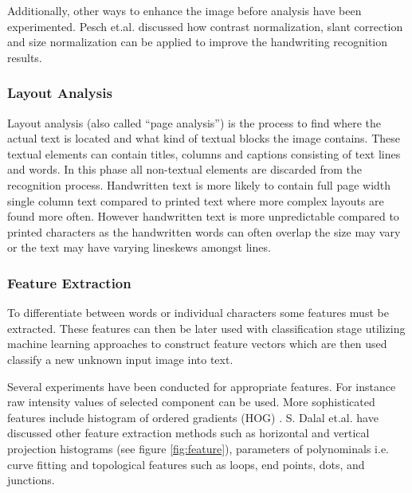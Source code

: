 \documentclass{article}
\begin{document}
        Additionally, other ways to enhance the image before analysis have been experimented. Pesch et.al. discussed how contrast normalization, slant correction and size normalization can be applied to improve the handwriting recognition results. \cite{Pesch2012}

      \subsubsection{Layout Analysis}
        Layout analysis (also called ``page analysis'') is the process to find where the actual text is located and what kind of textual blocks the image contains. These textual elements can contain titles, columns and captions consisting of text lines and words. In this phase all non-textual elements are discarded from the recognition process. Handwritten text is more likely to contain full page width single column text compared to printed text where more complex layouts are found more often. However handwritten text is more unpredictable compared to printed characters as the handwritten words can often overlap the size may vary or the text may have varying lineskews amongst lines.

      \subsubsection{Feature Extraction}
        To differentiate between words or individual characters some features must be extracted. These features can then be later used with classification stage utilizing machine learning approaches to construct feature vectors which are then used classify a new unknown input image into text.

        Several experiments have been conducted for appropriate features. For instance raw intensity values of selected component can be used. More sophisticated features include histogram of ordered gradients (HOG) \cite{Dalal2005}. S. Dalal et.al. have discussed other feature extraction methods such as horizontal and vertical projection histograms (see figure \ref{fig:feature}), parameters of polynominals i.e. curve fitting and topological features such as loops, end points, dots, and junctions. \cite{Dalal}
\end{document}
